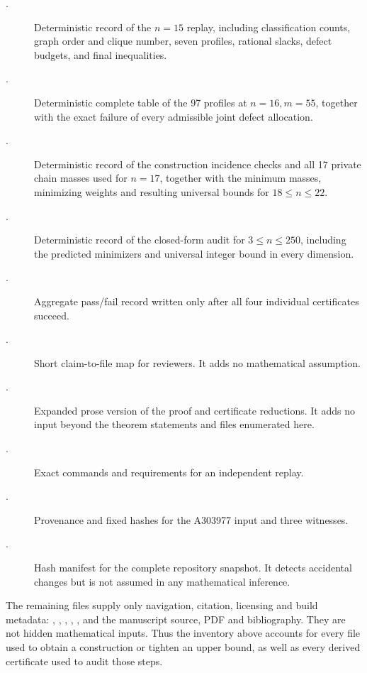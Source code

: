 \documentclass[11pt]{article}
\begin{document}
\begin{description}
 \item[.]
 Deterministic record of the $n=15$ replay, including classification counts,
 graph order and clique number, seven profiles, rational slacks, defect
 budgets, and final inequalities.

 \item[.]
 Deterministic complete table of the 97 profiles at $n=16,m=55$, together
 with the exact failure of every admissible joint defect allocation.

 \item[.]
 Deterministic record of the construction incidence checks and all 17 private
 chain masses used for $n=17$, together with the minimum masses, minimizing
 weights and resulting universal bounds for $18\leq n\leq22$.

 \item[.]
 Deterministic record of the closed-form audit for $3\leq n\leq250$, including
 the predicted minimizers and universal integer bound in every dimension.

 \item[.]
 Aggregate pass/fail record written only after all four individual
 certificates succeed.

 \item[.]
 Short claim-to-file map for reviewers.  It adds no mathematical assumption.

 \item[.]
 Expanded prose version of the proof and certificate reductions.  It adds no
 input beyond the theorem statements and files enumerated here.

 \item[.]
 Exact commands and requirements for an independent replay.

 \item[.]
 Provenance and fixed hashes for the A303977 input and three witnesses.

 \item[.]
 Hash manifest for the complete repository snapshot.  It detects accidental
 changes but is not assumed in any mathematical inference.
\end{description}

The remaining files supply only navigation, citation, licensing and build
metadata: , , ,
, , and the manuscript source, PDF and
bibliography.  They are not hidden mathematical inputs.  Thus the inventory
above accounts for every file used to obtain a construction or tighten an
upper bound, as well as every derived certificate used to audit those steps.
\end{document}

